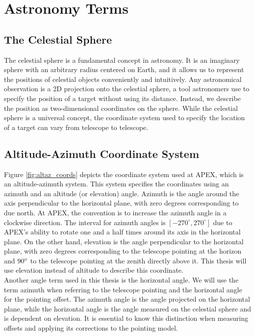\section{Astronomy Terms}
\subsection{The Celestial Sphere}
The celestial sphere is a fundamental concept in astronomy.
It is an imaginary sphere with an arbitrary radius centered on Earth, and it allows us to represent the positions of celestial objects conveniently and intuitively.
Any astronomical observation is a 2D projection onto the celestial sphere, a tool astronomers use to specify the position of a target without using its distance.
Instead, we describe the position as two-dimensional coordinates on the sphere.
While the celestial sphere is a universal concept, the coordinate system used to specify the location of a target can vary from telescope to telescope.




\subsection{Altitude-Azimuth Coordinate System}
Figure \ref{fig:altaz_coords} depicts the coordinate system used at APEX, which is an altitude-azimuth system.
This system specifies the coordinates using an azimuth and an altitude (or elevation) angle.
Azimuth is the angle around the axis perpendicular to the horizontal plane, with zero degrees corresponding to due north.
At APEX, the convention is to increase the azimuth angle in a clockwise direction.
The interval for azimuth angles is $[-270^\circ,270^\circ]$ due to APEX's ability to rotate one and a half times around its axis in the horizontal plane.
On the other hand, elevation is the angle perpendicular to the horizontal plane, with zero degrees corresponding to the telescope pointing at the horizon and $90^\circ$ to the telescope pointing at the zenith directly above it.
This thesis will use elevation instead of altitude to describe this coordinate.\\

Another angle term used in this thesis is the horizontal angle.
We will use the term azimuth when referring to the telescope pointing and the horizontal angle for the pointing offset.
The azimuth angle is the angle projected on the horizontal plane, while the horizontal angle is the angle measured on the celestial sphere and is dependent on elevation.
It is essential to know this distinction when measuring offsets and applying its corrections to the pointing model.

